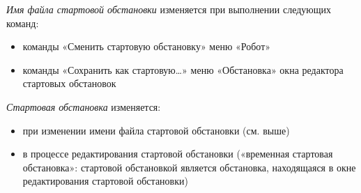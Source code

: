 \documentclass[12pt,a4paper]{article}
\begin{document}
\emph{Имя файла стартовой обстановки} изменяется при выполнении следующих команд:
\begin{itemize}
\item команды  «Сменить стартовую обстановку» меню «Робот»
\item команды «Сохранить как стартовую\dots» меню «Обстановка» окна редактора стартовых обстановок
\end{itemize}

\emph{Стартовая обстановка} изменяется:
\begin{itemize}
\item при изменении имени файла стартовой обстановки (см. выше)
\item в процессе редактирования стартовой обстановки («временная стартовая обстановка»: стартовой обстановкой является обстановка, находящаяся в окне редактирования стартовой обстановки)
\end{itemize}
\end{document}
